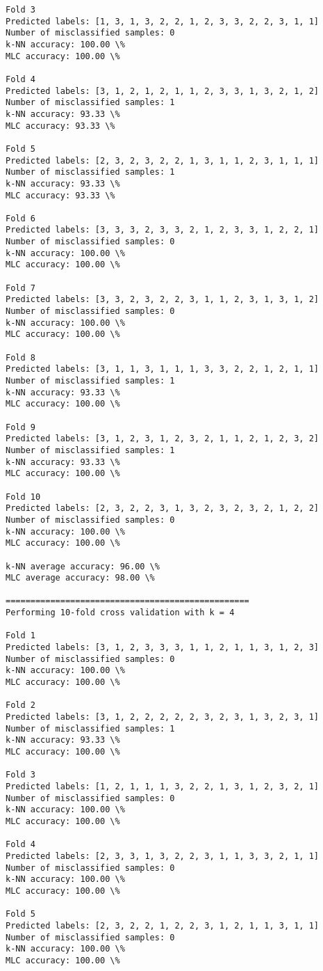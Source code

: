 \documentclass[11pt]{article}
\begin{document}
\begin{Verbatim}[commandchars=\\\{\}]
Fold 3
Predicted labels: [1, 3, 1, 3, 2, 2, 1, 2, 3, 3, 2, 2, 3, 1, 1]
Number of misclassified samples: 0
k-NN accuracy: 100.00 \%
MLC accuracy: 100.00 \%

Fold 4
Predicted labels: [3, 1, 2, 1, 2, 1, 1, 2, 3, 3, 1, 3, 2, 1, 2]
Number of misclassified samples: 1
k-NN accuracy: 93.33 \%
MLC accuracy: 93.33 \%

Fold 5
Predicted labels: [2, 3, 2, 3, 2, 2, 1, 3, 1, 1, 2, 3, 1, 1, 1]
Number of misclassified samples: 1
k-NN accuracy: 93.33 \%
MLC accuracy: 93.33 \%

Fold 6
Predicted labels: [3, 3, 3, 2, 3, 3, 2, 1, 2, 3, 3, 1, 2, 2, 1]
Number of misclassified samples: 0
k-NN accuracy: 100.00 \%
MLC accuracy: 100.00 \%

Fold 7
Predicted labels: [3, 3, 2, 3, 2, 2, 3, 1, 1, 2, 3, 1, 3, 1, 2]
Number of misclassified samples: 0
k-NN accuracy: 100.00 \%
MLC accuracy: 100.00 \%

Fold 8
Predicted labels: [3, 1, 1, 3, 1, 1, 1, 3, 3, 2, 2, 1, 2, 1, 1]
Number of misclassified samples: 1
k-NN accuracy: 93.33 \%
MLC accuracy: 100.00 \%

Fold 9
Predicted labels: [3, 1, 2, 3, 1, 2, 3, 2, 1, 1, 2, 1, 2, 3, 2]
Number of misclassified samples: 1
k-NN accuracy: 93.33 \%
MLC accuracy: 100.00 \%

Fold 10
Predicted labels: [2, 3, 2, 2, 3, 1, 3, 2, 3, 2, 3, 2, 1, 2, 2]
Number of misclassified samples: 0
k-NN accuracy: 100.00 \%
MLC accuracy: 100.00 \%

k-NN average accuracy: 96.00 \%
MLC average accuracy: 98.00 \%

=================================================
Performing 10-fold cross validation with k = 4

Fold 1
Predicted labels: [3, 1, 2, 3, 3, 3, 1, 1, 2, 1, 1, 3, 1, 2, 3]
Number of misclassified samples: 0
k-NN accuracy: 100.00 \%
MLC accuracy: 100.00 \%

Fold 2
Predicted labels: [3, 1, 2, 2, 2, 2, 2, 3, 2, 3, 1, 3, 2, 3, 1]
Number of misclassified samples: 1
k-NN accuracy: 93.33 \%
MLC accuracy: 100.00 \%

Fold 3
Predicted labels: [1, 2, 1, 1, 1, 3, 2, 2, 1, 3, 1, 2, 3, 2, 1]
Number of misclassified samples: 0
k-NN accuracy: 100.00 \%
MLC accuracy: 100.00 \%

Fold 4
Predicted labels: [2, 3, 3, 1, 3, 2, 2, 3, 1, 1, 3, 3, 2, 1, 1]
Number of misclassified samples: 0
k-NN accuracy: 100.00 \%
MLC accuracy: 100.00 \%

Fold 5
Predicted labels: [2, 3, 2, 2, 1, 2, 2, 3, 1, 2, 1, 1, 3, 1, 1]
Number of misclassified samples: 0
k-NN accuracy: 100.00 \%
MLC accuracy: 100.00 \%


\end{Verbatim}
\end{document}
